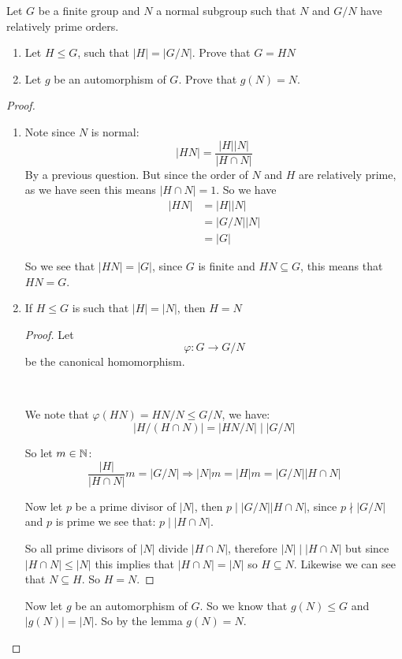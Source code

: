 \begin{exercise}
    Let $G$ be a finite group and $N$ a normal subgroup such that $N$ and $G/N$ have relatively prime orders.
    \begin{enumerate}[label = (\alph*)]
        \item Let $H\leq G$, such that $|H| = |G/N|$. Prove that $G = HN$
        \item Let $g$ be an automorphism of $G$. Prove that $g(N) = N$.
    \end{enumerate}
    \begin{proof}
        \begin{enumerate}[label = (\alph*)]
            \item  Note since $N$ is normal:\[|HN| = \frac{|H||N|}{|H\cap N|}\] By a previous question. But since the order of $N$ and $H$ are relatively prime, as we have seen this means $|H\cap N| = 1$.
            So we have \begin{align*}
                |HN| &= |H||N|\\
                &= |G/N||N|\\
                &= |G|
            \end{align*}

            So we see that $|HN| = |G|$, since $G$ is finite and $HN\subseteq G$, this means that $HN = G$.

            \item \begin{lemma}
                If $H\leq G$ is such that $|H| = |N|$, then $H = N$
                \begin{proof}
                    Let \[\varphi\colon G\rightarrow G/N\] be the canonical homomorphism.

                    \

                    We note that $\varphi(HN) = HN/N\leq G/N$, we have:\begin{equation}
                       |H/(H\cap N)| = |HN/N| \mid |G/N|
                    \end{equation}

                    So let $m\in \mathbb{N}$:\[
                        \frac{|H|}{|H\cap N|}m = |G/N| \Rightarrow |N|m = |H|m = |G/N||H\cap N|
                    \]

                    Now let $p$ be a prime divisor of $|N|$, then $p\mid |G/N||H\cap N|$, since $p\nmid |G/N|$ and $p$ is prime we see that: $p\mid |H\cap N|$.

                    So all prime divisors of $|N|$ divide $|H\cap N|$, therefore $|N|\mid |H\cap N|$ but since $|H\cap N|\leq |N|$ this implies that $|H\cap N| = |N|$ so $H\subseteq N$. Likewise we can see that $N\subseteq H$. So $H = N$.
                \end{proof}
            \end{lemma}

            Now let $g$ be an automorphism of $G$. So we know that $g(N)\leq G$ and $|g(N)| = |N|$. So by the lemma $g(N) = N$. 
        \end{enumerate}
    \end{proof}
\end{exercise}
